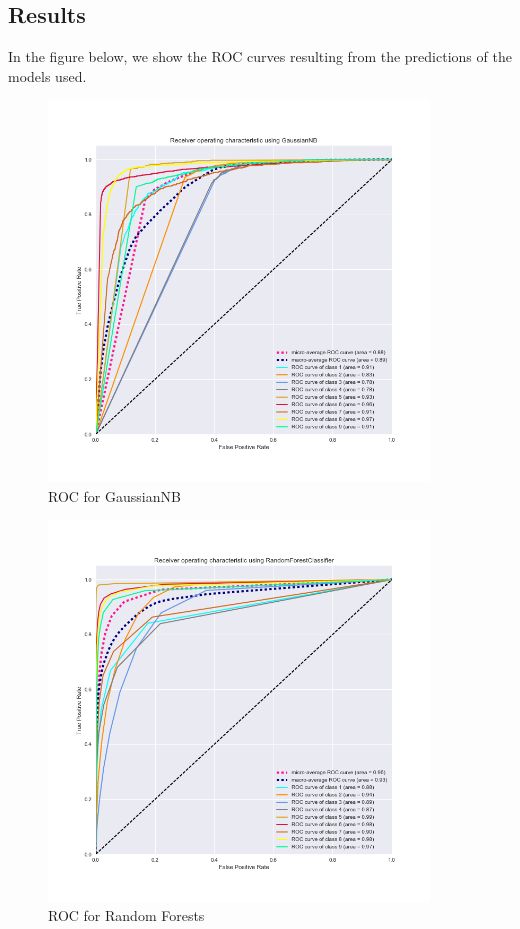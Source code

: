 \documentclass[a4paper,english,12pt]{article}
\begin{document}
\subsection{Results}
In the figure below, we show the ROC curves resulting from the predictions of the models used. 

\begin{figure}[H]
	\centering
	\includegraphics[width=0.9\textwidth,keepaspectratio]{ROC_OvR_GaussianNB}
	\caption{ROC for GaussianNB}
\end{figure}

\begin{figure}[H]
	\centering
	\includegraphics[width=0.9\textwidth,keepaspectratio]{ROC_OvR_RandomForestClassifier}
	\caption{ROC for Random Forests}
\end{figure}
\end{document}
